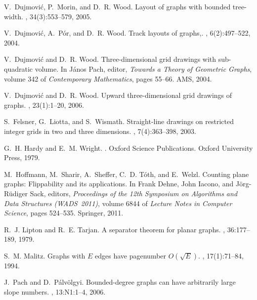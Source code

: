 \documentclass[12pt]{article}
\begin{document}
\begin{thebibliography}{10}
V.~Dujmovi{\'c}, P.~Morin, and D.~R. Wood.
\newblock Layout of graphs with bounded tree-width.
, 34(3):553--579, 2005.

V.~Dujmovi{\'c}, A.~P\'or, and D.~R. Wood.
\newblock Track layouts of graphs,.
,
  6(2):497--522, 2004.

V.~Dujmovi{\'c} and D.~R. Wood.
\newblock Three-dimensional grid drawings with sub-quadratic volume.
\newblock In J\'{a}nos Pach, editor, {\em Towards a Theory of Geometric
  Graphs}, volume 342 of {\em Contemporary Mathematics}, pages 55--66. AMS,
  2004.

V.~Dujmovi{\'c} and D.~R. Wood.
\newblock Upward three-dimensional grid drawings of graphs.
, 23(1):1--20, 2006.

S.~Felsner, G.~Liotta, and S.~Wismath.
\newblock Straight-line drawings on restricted integer grids in two and three
  dimensions.
, 7(4):363--398,
  2003.

G.~H. Hardy and E.~M. Wright.
.
\newblock Oxford Science Publications. Oxford University Press, 1979.

M.~Hoffmann, M.~Sharir, A.~Sheffer, C.~D. T{\'o}th, and E.~Welzl.
\newblock Counting plane graphs: Flippability and its applications.
\newblock In Frank Dehne, John Iacono, and J{\"o}rg-R{\"u}diger Sack, editors,
  {\em Proceedings of the 12th Symposium on Algorithms and Data Structures
  (WADS~2011)}, volume 6844 of {\em Lecture Notes in Computer Science}, pages
  524--535. Springer, 2011.

R.~J. Lipton and R.~E. Tarjan.
\newblock A separator theorem for planar graphs.
, 36:177--189, 1979.

S.~M. Malitz.
\newblock Graphs with {$E$} edges have pagenumber {$O(\sqrt{E})$}.
, 17(1):71--84, 1994.

J.~Pach and D.~P\'alv\"olgyi.
\newblock Bounded-degree graphs can have arbitrarily large slope numbers.
, 13:N1:1--4, 2006.


\end{thebibliography}
\end{document}
